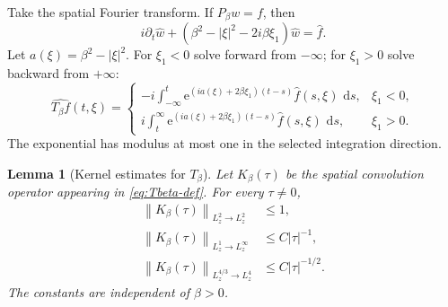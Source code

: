 \documentclass[11pt,oneside]{book}
\newtheorem{lemma}[theorem]{Lemma}
\theoremstyle{definition}
\theoremstyle{remark}
\newcommand{\1}{\mathbf 1}
\newcommand{\dd}{\,\mathrm d}
\newcommand{\norm}[1]{\left\lVert #1\right\rVert}
\newcommand{\e}{\mathrm e}
\begin{document}
Take the spatial Fourier transform.  If $P_\beta w=f$, then
\begin{equation}
 i\partial_t\widehat w
 +(\beta^2-|\xi|^2-2i\beta\xi_1)\widehat w
 =\widehat f.                                      \label{eq:Pbeta-ODE}
\end{equation}
Let $a(\xi)=\beta^2-|\xi|^2$.  For $\xi_1<0$ solve forward from $-\infty$;
for $\xi_1>0$ solve backward from $+\infty$:
\begin{equation}
 \widehat{T_\beta f}(t,\xi)=
 \begin{cases}
 -i\displaystyle\int_{-\infty}^t
   \e^{(ia(\xi)+2\beta\xi_1)(t-s)}\widehat f(s,\xi)\,\dd s,
   &\xi_1<0,\\[1.2em]
 i\displaystyle\int_t^{\infty}
   \e^{(ia(\xi)+2\beta\xi_1)(t-s)}\widehat f(s,\xi)\,\dd s,
   &\xi_1>0.
 \end{cases}                                      \label{eq:Tbeta-def}
\end{equation}
The exponential has modulus at most one in the selected integration
direction.

\begin{lemma}[Kernel estimates for $T_\beta$]\label{lem:Tbeta-kernel}
Let $K_\beta(\tau)$ be the spatial convolution operator appearing in
\eqref{eq:Tbeta-def}.  For every $\tau\ne0$,
\begin{align}
 \norm{K_\beta(\tau)}_{L^2_z\to L^2_z}&\le1,        \label{eq:K-L2}\\
 \norm{K_\beta(\tau)}_{L^1_z\to L^\infty_z}
 &\le C|\tau|^{-1},                                 \label{eq:K-disp}\\
 \norm{K_\beta(\tau)}_{L^{4/3}_z\to L^4_z}
 &\le C|\tau|^{-1/2}.                              \label{eq:K-43-4}
\end{align}
The constants are independent of $\beta>0$.
\end{lemma}
\end{document}
